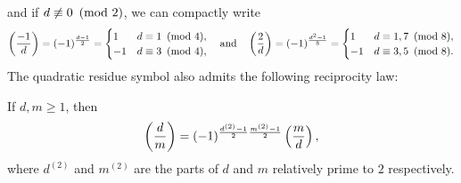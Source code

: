 \documentclass[12pt,reqno,oneside]{amsart}
\begin{document}
    and if $d \not\equiv 0 \ \left(\text{mod }2\right)$, we can compactly write
    \[
        \left(\frac{-1}{d}\right) = (-1)^{\frac{d-1}{2}} = \begin{cases} 1 & \text{$d \equiv 1 \ \left(\text{mod }4\right)$}, \\ -1 & \text{$d \equiv 3 \ \left(\text{mod }4\right)$}, \end{cases} \quad \text{and} \quad \left(\frac{2}{d}\right) = (-1)^{\frac{d^{2}-1}{8}} = \begin{cases} 1 & \text{$d \equiv 1,7 \ \left(\text{mod }8\right)$}, \\ -1 & \text{$d \equiv 3,5 \ \left(\text{mod }8\right)$}. \end{cases}
    \]
     The quadratic residue symbol also admits the following reciprocity law:

    \begin{theorem}
        If $d,m \ge 1$, then
        \[
            \left(\frac{d}{m}\right) = (-1)^{\frac{d^{(2)}-1}{2}\frac{m^{(2)}-1}{2}}\left(\frac{m}{d}\right),
        \]
        where $d^{(2)}$ and $m^{(2)}$ are the parts of $d$ and $m$ relatively prime to $2$ respectively.
    \end{theorem}
\end{document}
